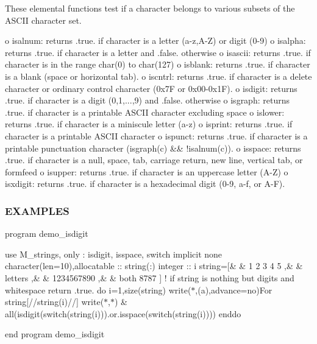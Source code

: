 \begin{DoxyVerb}   These elemental functions test if a character belongs to various subsets of the ASCII character set.

   o isalnum:   returns .true. if character is a letter (a-z,A-Z) or digit (0-9)
   o isalpha:   returns .true. if character is a letter and .false. otherwise
   o isascii:   returns .true. if character is in the range char(0) to char(127)
   o isblank:   returns .true. if character is a blank (space or horizontal tab).
   o iscntrl:   returns .true. if character is a delete character or ordinary control character (0x7F or 0x00-0x1F).
   o isdigit:   returns .true. if character is a digit (0,1,...,9) and .false. otherwise
   o isgraph:   returns .true. if character is a printable ASCII character excluding space
   o islower:   returns .true. if character is a miniscule letter (a-z)
   o isprint:   returns .true. if character is a printable ASCII character
   o ispunct:   returns .true. if character is a printable punctuation character (isgraph(c) && !isalnum(c)).
   o isspace:   returns .true. if character is a null, space, tab, carriage return, new line, vertical tab, or formfeed
   o isupper:   returns .true. if character is an uppercase letter (A-Z)
   o isxdigit:  returns .true. if character is a hexadecimal digit (0-9, a-f, or A-F).
\end{DoxyVerb}


\subsubsection*{E\+X\+A\+M\+P\+L\+ES}

program demo\+\_\+isdigit

use M\+\_\+strings, only \+: isdigit, isspace, switch implicit none character(len=10),allocatable \+:\+: string(\+:) integer \+:\+: i string=\mbox{[}\& \& \textquotesingle{}1 2 3 4 5 \textquotesingle{} ,\& \& \textquotesingle{}letters \textquotesingle{} ,\& \& \textquotesingle{}1234567890\textquotesingle{} ,\& \& \textquotesingle{}both 8787 \textquotesingle{} \mbox{]} ! if string is nothing but digits and whitespace return .true. do i=1,size(string) write($\ast$,\textquotesingle{}(a)\textquotesingle{},advance=\textquotesingle{}no\textquotesingle{})\textquotesingle{}For string\mbox{[}\textquotesingle{}//string(i)//\textquotesingle{}\mbox{]}\textquotesingle{} write($\ast$,$\ast$) \& all(isdigit(switch(string(i))).or.\+isspace(switch(string(i)))) enddo

end program demo\+\_\+isdigit

